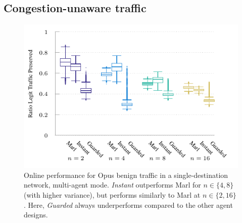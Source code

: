 \documentclass[10pt, times, conference, letterpaper]{IEEEtran}
\begin{document}
\subsection{Congestion-unaware traffic}
%	
%	
\begin{figure}
	\centering
	\includegraphics[width=0.8\linewidth]{../plots/tnsm-udp-box-separate}
	\vspace{-1em}
	\caption{
		Online performance for Opus benign traffic in a single-destination network, multi-agent mode.
		\emph{Instant} outperforms Marl for $n \in \{4, 8\}$ (with higher variance), but performs similarly to Marl at $n\in \{2, 16\}$.
		Here, \emph{Guarded} always underperforms compared to the other agent designs.
		\vspace{-1em}
		\label{fig:udp-tree-box}
	}
\end{figure}
\end{document}
